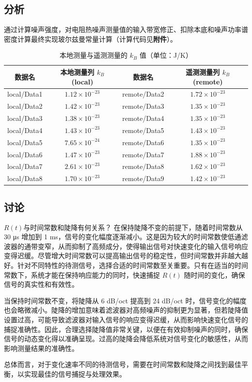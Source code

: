 \subsection{分析}

通过计算噪声强度，对电阻热噪声测量值的输入带宽修正、扣除本底和噪声功率谱密度计算最终实现玻尔兹曼常量计算（计算代码见\textbf{附件}）。

\begin{table}[h!]
	\centering
	\renewcommand{\arraystretch}{1.5} %
	\caption{本地测量与遥测测量的 $k_B$ 值（单位：J/K）}
	\label{tab:kbvalues}
	\begin{tabular}{|cc|cc|}
		\hline
		\textbf{数据名} & \textbf{本地测量列 $k_B$ (local)} & \textbf{数据名} & \textbf{遥测测量列 $k_B$ (remote)} \\ \hline
		local/Data1 & $1.12\times10^{-23}$ & remote/Data2 & $1.72\times10^{-23}$ \\ 
		local/Data2 & $1.42\times10^{-23}$ & remote/Data3 & $1.35\times10^{-23}$ \\ 
		local/Data3 & $1.38\times10^{-23}$ & remote/Data4 & $1.35\times10^{-23}$ \\ 
		local/Data4 & $1.43\times10^{-23}$ & remote/Data5 & $1.43\times10^{-23}$ \\ 
		local/Data5 & $7.65\times10^{-24}$ & remote/Data6 & $1.35\times10^{-23}$ \\ 
		local/Data6 & $1.47\times10^{-23}$ & remote/Data7 & $1.88\times10^{-23}$ \\ 
		local/Data7 & $2.61\times10^{-23}$ & remote/Data8 & $1.62\times10^{-23}$ \\ 
		local/Data8 & $1.70\times10^{-23}$ & remote/Data9 & $1.42\times10^{-23}$ \\ \hline
	\end{tabular}
\end{table}

\subsection{讨论}

\begin{ubox}{$R(t)$与时间常数和陡降有何关系？}
	在保持陡降不变的前提下，随着时间常数从 30 μs 增加到 1 ms，信号的变化幅度逐渐减小。这是因为较大的时间常数使低通滤波器的通带变窄，从而抑制了高频成分，使得输出信号对快速变化的输入信号响应变得迟缓。尽管增大时间常数可以提高输出信号的稳定性，但时间常数并非越大越好。针对不同特性的待测信号，选择合适的时间常数至关重要。只有在适当的时间常数下，系统才能在保持响应能力的同时，快速捕捉 \( R(t) \) 随时间的变化，确保信号的真实性和有效性。
	
	当保持时间常数不变，将陡降从 6 dB/oct 提高到 24 dB/oct 时，信号变化的幅度也会略微减小。陡降的增加意味着滤波器对高频噪声的抑制更为显著，但若陡降值设置过高，可能导致滤波器对输入信号的响应变得迟缓，从而影响快速变化信号的捕捉准确性。因此，合理选择陡降值非常关键，以便在有效抑制噪声的同时，确保信号的动态变化得以准确呈现。过高的陡降会降低系统对信号变化的敏感性，从而影响测量结果的准确性。
	
	总体而言，对于变化速率不同的待测信号，需要在时间常数和陡降之间找到最佳平衡，以实现最佳的信号捕捉与处理效果。
\end{ubox}

